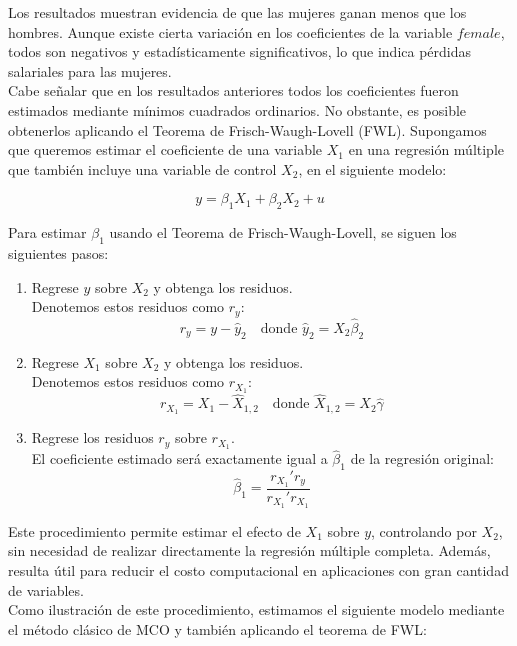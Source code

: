 \documentclass[12pt,a4paper,onecolumn]{article}
\begin{document}
Los resultados muestran evidencia de que las mujeres ganan menos que los hombres. Aunque existe cierta variación en los coeficientes de la variable $female$, todos son negativos y estadísticamente significativos, lo que indica pérdidas salariales para las mujeres.\\

Cabe señalar que en los resultados anteriores todos los coeficientes fueron estimados mediante mínimos cuadrados ordinarios. 
No obstante, es posible obtenerlos aplicando el Teorema de Frisch-Waugh-Lovell (FWL). 
Supongamos que queremos estimar el coeficiente de una variable $X_1$ en una regresión múltiple que también incluye una variable de control $X_2$, en el siguiente modelo:

\[
y = \beta_1 X_1 + \beta_2 X_2 + u
\]

Para estimar $\beta_1$ usando el Teorema de Frisch-Waugh-Lovell, se siguen los siguientes pasos:

\begin{enumerate}
    \item Regrese $y$ sobre $X_2$ y obtenga los residuos.\\
    Denotemos estos residuos como $r_y$:
    \[
    r_y = y - \hat{y}_2 \quad \text{donde } \hat{y}_2 = X_2 \hat{\beta}_2
    \]

    \item Regrese $X_1$ sobre $X_2$ y obtenga los residuos.\\
    Denotemos estos residuos como $r_{X_1}$:
    \[
    r_{X_1} = X_1 - \hat{X}_{1,2} \quad \text{donde } \hat{X}_{1,2} = X_2 \hat{\gamma}
    \]

    \item Regrese los residuos $r_y$ sobre $r_{X_1}$.\\
    El coeficiente estimado será exactamente igual a $\hat{\beta}_1$ de la regresión original:
    \[
    \hat{\beta}_1 = \frac{r_{X_1}' r_y}{r_{X_1}' r_{X_1}}
    \]
\end{enumerate}

Este procedimiento permite estimar el efecto de $X_1$ sobre $y$, controlando por $X_2$, sin necesidad de realizar directamente la regresión múltiple completa. 
Además, resulta útil para reducir el costo computacional en aplicaciones con gran cantidad de variables.\\

Como ilustración de este procedimiento, estimamos el siguiente modelo mediante el método clásico de MCO y también aplicando el teorema de FWL:
\end{document}

